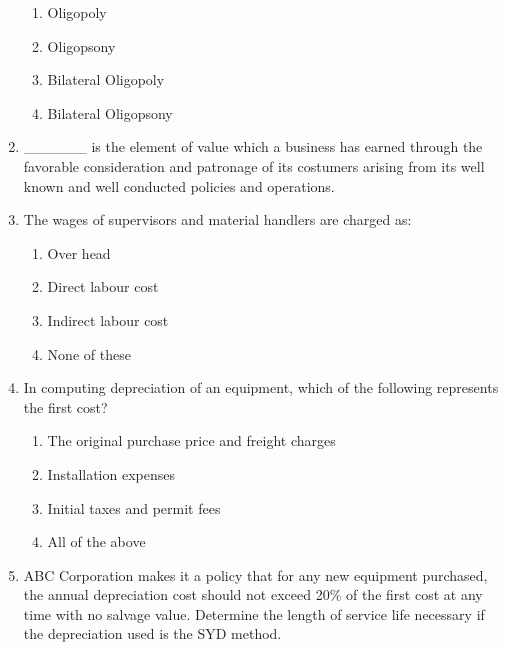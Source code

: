 \documentclass[11pt,a4paper]{article}
\begin{document}
\begin{enumerate}
\begin{enumerate}[label=\Alph*.]
\item{Oligopoly}
\item{Oligopsony}
\item{Bilateral Oligopoly}
\item{Bilateral Oligopsony}
\end{enumerate}
\item{\_\_\_\_\_\_ is the element of value which a business has earned through the favorable consideration and patronage of its costumers arising from its well known and well conducted policies and operations.}
\\
\item{The wages of supervisors and material handlers are charged as:}
\begin{enumerate}[label=\Alph*.]
\item{Over head}
\item{Direct labour cost}
\item{Indirect labour cost}
\item{None of these}
\end{enumerate}
\item{In computing depreciation of an equipment, which of the following represents the first cost?}
\begin{enumerate}[label=\Alph*.]
\item{The original purchase price and freight charges}
\item{Installation expenses}
\item{Initial taxes and permit fees}
\item{All of the above}
\end{enumerate}
\item{ABC Corporation makes it a policy that for any new equipment purchased, the annual depreciation cost should not exceed 20\% of the first cost at any time with no salvage value. Determine the length of service life necessary if the depreciation used is the SYD method.}
\\
\end{enumerate}
\end{document}
